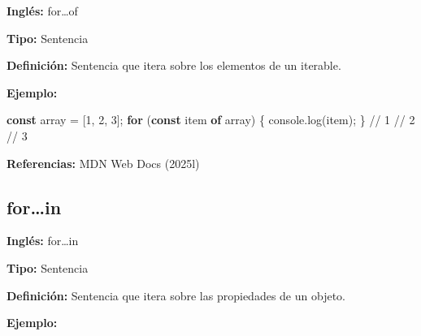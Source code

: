 \documentclass[
  letterpaper,
  DIV=11,
  numbers=noendperiod]{scrreprt}
\newenvironment{Shaded}{\begin{snugshade}}{\end{snugshade}}
\newcommand{\BuiltInTok}[1]{\textcolor[rgb]{0.00,0.23,0.31}{#1}}
\newcommand{\CommentTok}[1]{\textcolor[rgb]{0.37,0.37,0.37}{#1}}
\newcommand{\ControlFlowTok}[1]{\textcolor[rgb]{0.00,0.23,0.31}{\textbf{#1}}}
\newcommand{\DataTypeTok}[1]{\textcolor[rgb]{0.68,0.00,0.00}{#1}}
\newcommand{\DecValTok}[1]{\textcolor[rgb]{0.68,0.00,0.00}{#1}}
\newcommand{\FunctionTok}[1]{\textcolor[rgb]{0.28,0.35,0.67}{#1}}
\newcommand{\KeywordTok}[1]{\textcolor[rgb]{0.00,0.23,0.31}{\textbf{#1}}}
\newcommand{\NormalTok}[1]{\textcolor[rgb]{0.00,0.23,0.31}{#1}}
\newcommand{\OperatorTok}[1]{\textcolor[rgb]{0.37,0.37,0.37}{#1}}
\newcommand{\SpecialCharTok}[1]{\textcolor[rgb]{0.37,0.37,0.37}{#1}}
\newcommand{\StringTok}[1]{\textcolor[rgb]{0.13,0.47,0.30}{#1}}
\newcommand{\VerbatimStringTok}[1]{\textcolor[rgb]{0.13,0.47,0.30}{#1}}
\let\oldsubsection\subsection
\renewcommand{\subsection}{\phantomsection\oldsubsection}
\begin{document}
\textbf{Inglés:} for\ldots of

\textbf{Tipo:} Sentencia

\textbf{Definición:} Sentencia que itera sobre los elementos de un
iterable.

\textbf{Ejemplo:}

\begin{Shaded}
\begin{Highlighting}[]
\KeywordTok{const}\NormalTok{ array }\OperatorTok{=}\NormalTok{ [}\DecValTok{1}\OperatorTok{,} \DecValTok{2}\OperatorTok{,} \DecValTok{3}\NormalTok{]}\OperatorTok{;}
\ControlFlowTok{for}\NormalTok{ (}\KeywordTok{const}\NormalTok{ item }\KeywordTok{of}\NormalTok{ array) \{}
    \BuiltInTok{console}\OperatorTok{.}\FunctionTok{log}\NormalTok{(item)}\OperatorTok{;}
\NormalTok{\}}
\CommentTok{// 1}
\CommentTok{// 2}
\CommentTok{// 3}
\end{Highlighting}
\end{Shaded}

\textbf{Referencias:} MDN Web Docs (2025l)

\subsection*{for\ldots in}\label{glos-for_in}

\textbf{Inglés:} for\ldots in

\textbf{Tipo:} Sentencia

\textbf{Definición:} Sentencia que itera sobre las propiedades de un
objeto.

\textbf{Ejemplo:}

\begin{Shaded}
\end{Shaded}
\end{document}
